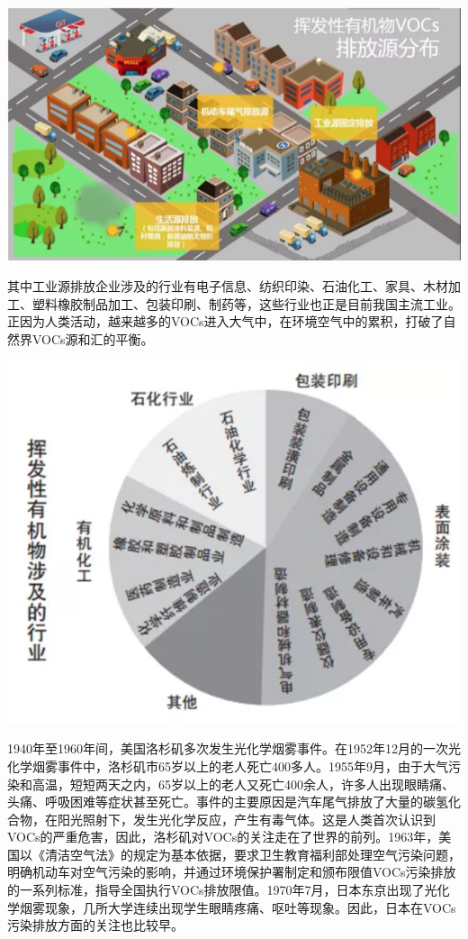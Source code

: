\documentclass[]{book}
\begin{document}
\includegraphics[width=8.33in]{images/voc4}

其中工业源排放企业涉及的行业有电子信息、纺织印染、石油化工、家具、木材加工、塑料橡胶制品加工、包装印刷、制药等，这些行业也正是目前我国主流工业。正因为人类活动，越来越多的VOCs进入大气中，在环境空气中的累积，打破了自然界VOCs源和汇的平衡。

\includegraphics[width=8.33in]{images/voc5}

1940年至1960年间，美国洛杉矶多次发生光化学烟雾事件。在1952年12月的一次光化学烟雾事件中，洛杉矶市65岁以上的老人死亡400多人。1955年9月，由于大气污染和高温，短短两天之内，65岁以上的老人又死亡400余人，许多人出现眼睛痛、头痛、呼吸困难等症状甚至死亡。事件的主要原因是汽车尾气排放了大量的碳氢化合物，在阳光照射下，发生光化学反应，产生有毒气体。这是人类首次认识到VOCs的严重危害，因此，洛杉矶对VOCs的关注走在了世界的前列。1963年，美国以《清洁空气法》的规定为基本依据，要求卫生教育福利部处理空气污染问题，明确机动车对空气污染的影响，并通过环境保护署制定和颁布限值VOCs污染排放的一系列标准，指导全国执行VOCs排放限值。1970年7月，日本东京出现了光化学烟雾现象，几所大学连续出现学生眼睛疼痛、呕吐等现象。因此，日本在VOCs污染排放方面的关注也比较早。
\end{document}
